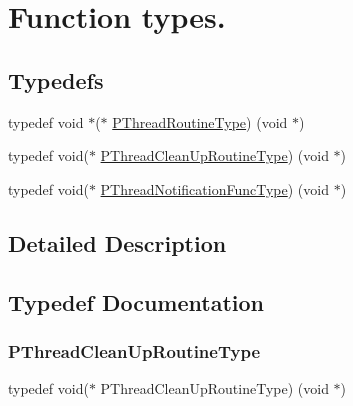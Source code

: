 \hypertarget{group__FUNC__DEFS}{}\section{Function types.}
\label{group__FUNC__DEFS}
\subsection*{Typedefs}
\begin{DoxyCompactItemize}
\item 
typedef void $\ast$($\ast$ \hyperlink{group__FUNC__DEFS_gaeef66643e734485d781ca826339879ea}{P\+Thread\+Routine\+Type}) (void $\ast$)
\item 
typedef void($\ast$ \hyperlink{group__FUNC__DEFS_ga77ca9e695666040451b77632df4847b9}{P\+Thread\+Clean\+Up\+Routine\+Type}) (void $\ast$)
\item 
typedef void($\ast$ \hyperlink{group__FUNC__DEFS_ga164076b53d35e4dba4c51bb336c15dab}{P\+Thread\+Notification\+Func\+Type}) (void $\ast$)
\end{DoxyCompactItemize}


\subsection{Detailed Description}


\subsection{Typedef Documentation}
\mbox{\label{group__FUNC__DEFS_ga77ca9e695666040451b77632df4847b9}} 
\subsubsection{\texorpdfstring{P\+Thread\+Clean\+Up\+Routine\+Type}{PThreadCleanUpRoutineType}}
{\footnotesize\ttfamily typedef void($\ast$ P\+Thread\+Clean\+Up\+Routine\+Type) (void $\ast$)}

\mbox{\label{group__FUNC__DEFS_ga164076b53d35e4dba4c51bb336c15dab}} 
